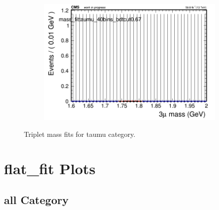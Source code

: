 \begin{figure}[H]
\begin{subfigure}{0.2\textwidth}
        \includegraphics[width=\textwidth]{power_law/plots/taumu/massfit_taumu_40bins_bdtcut0.67.png}
        \caption{}
    \end{subfigure}
    \caption{Triplet mass fits for taumu category.}
    \label{fig:powerlawtaumu}
\end{figure}

\section{flat\_fit Plots}

\subsection{all Category}
\label{sec:flatfitall}

